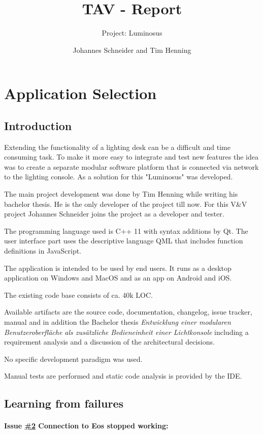 \documentclass{scrartcl}
\title{TAV - Report}
\subtitle{Project: Luminosus}
\author{Johannes Schneider and Tim Henning}
\begin{document}
\maketitle

\setcounter{section}{-1}
\section{Application Selection}

\subsection{Introduction}

Extending the functionality of a lighting desk can be a difficult and time consuming task. To make it more easy to integrate and test new features the idea was to create a separate modular software platform that is connected via network to the lighting console. As a solution for this "Luminosus" was developed.

The main project development was done by Tim Henning while writing his bachelor thesis. He is the only developer of the project till now. For this V\&V project Johannes Schneider joins the project as a developer and tester.

The programming language used is C++ 11 with syntax additions by Qt. The user interface part uses the descriptive language QML that includes function definitions in JavaScript.

The application is intended to be used by end users. It runs as a desktop application on Windows and MacOS and as an app on Android and iOS.

The existing code base consists of ca. 40k LOC.

Available artifacts are the source code, documentation, changelog, issue tracker, manual and in addition the Bachelor thesis \textit{Entwicklung einer modularen Benutzeroberfl\"ache als zus\"atzliche Bedieneinheit einer Lichtkonsole} including a requirement analysis and a discussion of the architectural decisions.

No specific development paradigm was used.

Manual tests are performed and static code analysis is provided by the IDE.

\subsection{Learning from failures}

\paragraph{Issue \href{https://github.com/ETCLabs/LuminosusEosEdition/issues/2}{\#2} Connection to Eos stopped working:}
\end{document}
